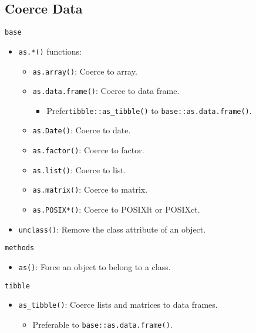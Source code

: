 \documentclass[]{book}
\providecommand{\tightlist}{%
  \setlength{\itemsep}{0pt}\setlength{\parskip}{0pt}}
\theoremstyle{definition}
\theoremstyle{definition}
\theoremstyle{definition}
\theoremstyle{remark}
\begin{document}
\subsection{Coerce Data}\label{coerce-data}

\texttt{base}

\begin{itemize}
\tightlist
\item
  \texttt{as.*()} functions:

  \begin{itemize}
  \tightlist
  \item
    \texttt{as.array()}: Coerce to array.
  \item
    \texttt{as.data.frame()}: Coerce to data frame.

    \begin{itemize}
    \tightlist
    \item
      Prefer\texttt{tibble::as\_tibble()} to
      \texttt{base::as.data.frame()}.
    \end{itemize}
  \item
    \texttt{as.Date()}: Coerce to date.
  \item
    \texttt{as.factor()}: Coerce to factor.
  \item
    \texttt{as.list()}: Coerce to list.
  \item
    \texttt{as.matrix()}: Coerce to matrix.
  \item
    \texttt{as.POSIX*()}: Coerce to POSIXlt or POSIXct.
  \end{itemize}
\item
  \texttt{unclass()}: Remove the class attribute of an object.
\end{itemize}

\texttt{methods}

\begin{itemize}
\tightlist
\item
  \texttt{as()}: Force an object to belong to a class.
\end{itemize}

\texttt{tibble}

\begin{itemize}
\tightlist
\item
  \texttt{as\_tibble()}: Coerce lists and matrices to data frames.

  \begin{itemize}
  \tightlist
  \item
    Preferable to \texttt{base::as.data.frame()}.
  \end{itemize}
\end{itemize}
\end{document}
